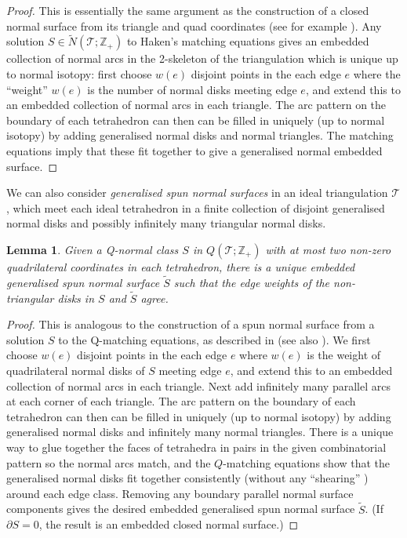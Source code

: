 \documentclass[12pt,reqno]{amsart}  %
\newtheorem{lemma}[thm]{Lemma}
\theoremstyle{definition}
\theoremstyle{remark}
\newcommand{\T}{\mathcal{T}}
\def\Z{\mathbb Z}
\def\bd{\partial}
\begin{document}
\begin{proof} 
This is essentially the same argument as the construction of a closed 
normal surface from its triangle and quad coordinates
(see for example \cite{Ma2}).
Any solution $S \in \tilde N(\T;\Z_+)$  to Haken's matching equations 
gives an embedded collection of 
normal arcs in the 2-skeleton of the triangulation which is unique up to 
normal isotopy: 
first choose $w(e)$ disjoint points in the each edge $e$ where the ``weight'' 
$w(e)$ is the number of normal disks meeting edge $e$, 
and extend this to an embedded collection of normal arcs in each triangle. 
The arc pattern on the boundary of each tetrahedron can then can be filled 
in uniquely (up to normal isotopy) 
by adding generalised normal disks  and normal triangles. The matching 
equations imply that these fit together
to give a generalised normal embedded surface.
\end{proof}

We can also consider {\em generalised spun normal surfaces} in an ideal 
triangulation $\T$, which meet each ideal tetrahedron in a finite 
collection of disjoint generalised normal disks and possibly infinitely 
many triangular normal disks.

\begin{lemma}
\label{gen_spun_class}
Given a Q-normal class $S$ in $Q(\T;\Z_+)$ with at most two non-zero 
quadrilateral coordinates in each tetrahedron, there is a unique embedded 
generalised spun normal surface $\tilde S$ such that the edge weights
of the non-triangular disks in $S$ and $\tilde S$ agree.
\end{lemma}

\begin{proof}
This is analogous to the construction of a spun normal surface from a 
solution $S$ to the Q-matching equations, as described in \cite{Ti} 
(see also \cite{DuGa}). We first choose $w(e)$ disjoint points in the 
each edge $e$ where $w(e)$ is the weight of quadrilateral normal disks 
of $S$ meeting edge $e$, and extend this to an embedded collection of 
normal arcs in each triangle. Next add  infinitely many parallel arcs 
at each corner of each triangle.  The arc pattern on the boundary of 
each tetrahedron can then can be filled in uniquely (up to normal isotopy) 
by adding generalised normal disks  and infinitely many normal triangles.
There is a unique way to glue together the faces of tetrahedra in pairs 
in the given combinatorial pattern so the normal arcs match, 
and the $Q$-matching equations show that the generalised normal disks fit 
together consistently (without any ``shearing'' ) around each edge class. 
Removing any boundary parallel normal surface components  gives the 
desired embedded generalised spun normal surface $\tilde S$.
(If $\bd S =0$, the result is an embedded closed normal surface.)
\end{proof}
\end{document}
